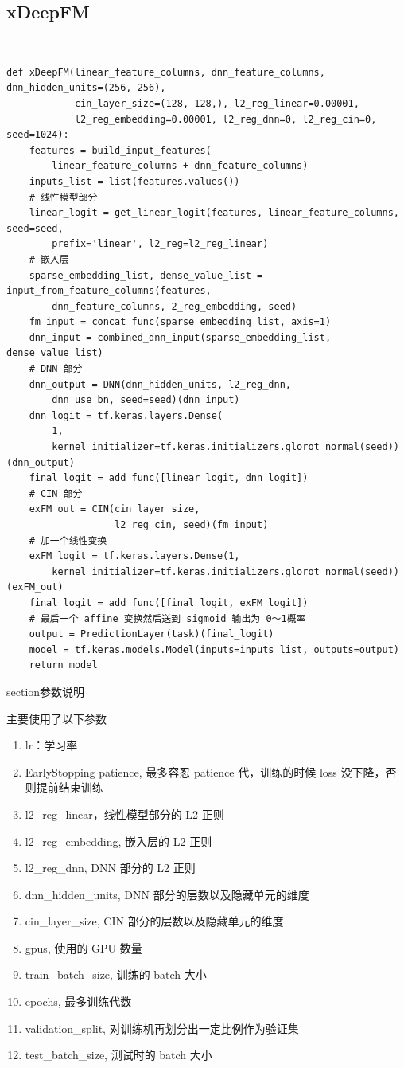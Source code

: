 \documentclass[degree=project,degree-type=project,cjk-font=noto]{thuthesis}
\begin{document}
\subsection{xDeepFM}

\
  \begin{verbatim}
def xDeepFM(linear_feature_columns, dnn_feature_columns, dnn_hidden_units=(256, 256),
            cin_layer_size=(128, 128,), l2_reg_linear=0.00001,
            l2_reg_embedding=0.00001, l2_reg_dnn=0, l2_reg_cin=0, seed=1024):
    features = build_input_features(
        linear_feature_columns + dnn_feature_columns)
    inputs_list = list(features.values())
    # 线性模型部分
    linear_logit = get_linear_logit(features, linear_feature_columns, seed=seed,
        prefix='linear', l2_reg=l2_reg_linear)
    # 嵌入层
    sparse_embedding_list, dense_value_list = input_from_feature_columns(features,
        dnn_feature_columns, 2_reg_embedding, seed)
    fm_input = concat_func(sparse_embedding_list, axis=1)
    dnn_input = combined_dnn_input(sparse_embedding_list, dense_value_list)
    # DNN 部分
    dnn_output = DNN(dnn_hidden_units, l2_reg_dnn,
        dnn_use_bn, seed=seed)(dnn_input)
    dnn_logit = tf.keras.layers.Dense(
        1,
        kernel_initializer=tf.keras.initializers.glorot_normal(seed))(dnn_output)
    final_logit = add_func([linear_logit, dnn_logit])
    # CIN 部分
    exFM_out = CIN(cin_layer_size,
                   l2_reg_cin, seed)(fm_input)
    # 加一个线性变换
    exFM_logit = tf.keras.layers.Dense(1,
        kernel_initializer=tf.keras.initializers.glorot_normal(seed))(exFM_out)
    final_logit = add_func([final_logit, exFM_logit])
    # 最后一个 affine 变换然后送到 sigmoid 输出为 0～1概率
    output = PredictionLayer(task)(final_logit)
    model = tf.keras.models.Model(inputs=inputs_list, outputs=output)
    return model
  \end{verbatim}

section{参数说明}

主要使用了以下参数

\begin{enumerate}
  \item lr：学习率
  \item EarlyStopping patience, 最多容忍 patience 代，训练的时候 loss 没下降，否则提前结束训练
  \item l2\_reg\_linear，线性模型部分的 L2 正则
  \item l2\_reg\_embedding, 嵌入层的 L2 正则
  \item l2\_reg\_dnn, DNN 部分的 L2 正则
  \item dnn\_hidden\_units, DNN 部分的层数以及隐藏单元的维度
  \item cin\_layer\_size, CIN 部分的层数以及隐藏单元的维度
  \item gpus, 使用的 GPU 数量
  \item train\_batch\_size, 训练的 batch 大小
  \item epochs, 最多训练代数
  \item validation\_split, 对训练机再划分出一定比例作为验证集
  \item test\_batch\_size, 测试时的 batch 大小
\end{enumerate}
\end{document}
